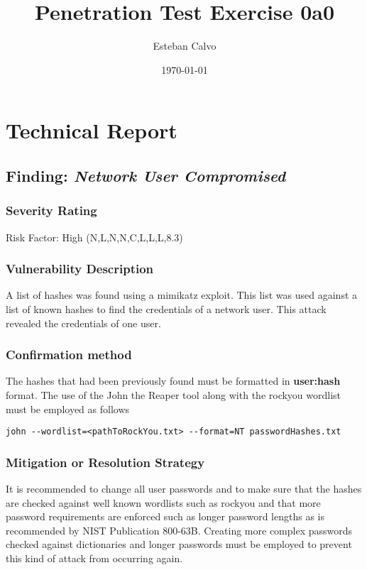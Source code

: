 \documentclass[notitlepage]{article}
\begin{document}
  
\title{Penetration Test Exercise 0a0}
\author{Esteban Calvo}
\date{\isodate\today}

\maketitle

\tableofcontents

\newpage
\section{Technical Report}

  \subsection{Finding: \emph{Network User Compromised}}
	\subsubsection*{Severity Rating}
	Risk Factor: High
    \cvss(N,L,N,N,C,L,L,L,8.3)
		
  	\subsubsection*{Vulnerability Description}
  		A list of hashes was found using a mimikatz exploit. This list was used against
        a list of known hashes to find the credentials of a network user. This attack revealed
        the credentials of one user. 

  	\subsubsection*{Confirmation method}
  	The hashes that had been previously found must be formatted in \textbf{user:hash} format. The use
    of the John the Reaper tool along with the rockyou wordlist must be employed as follows
    \begin{verbatim}
john --wordlist=<pathToRockYou.txt> --format=NT passwordHashes.txt
    \end{verbatim}
    
    \subsubsection*{Mitigation or Resolution Strategy}
    It is recommended to change all user passwords and to make sure that the hashes are checked against
    well known wordlists such as rockyou and that more password requirements are enforced such as longer password
    lengths as is recommended by NIST Publication 800-63B. Creating more complex passwords checked against
    dictionaries and longer passwords must be employed to prevent this kind of attack from occurring again.
\end{document}

